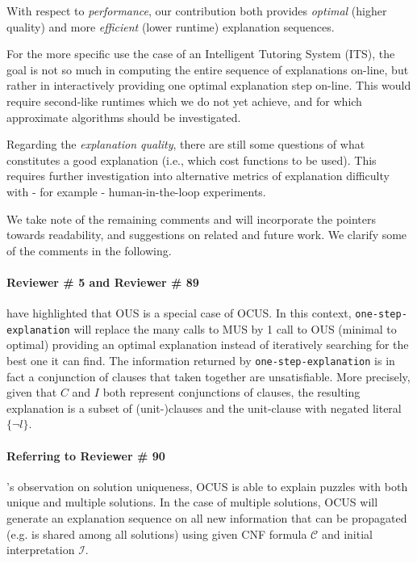 \documentclass{article}
\begin{document}
With respect to \textit{performance}, our contribution both provides \textit{optimal} (higher quality) and more \textit{efficient} (lower runtime) explanation sequences.

For the more specific use the case of an Intelligent Tutoring System (ITS), the goal is not so much in computing the entire sequence of explanations on-line, but rather in interactively providing one optimal explanation step on-line. %
This would require second-like runtimes which we do not yet achieve, and for which approximate algorithms should be investigated.

Regarding the \textit{explanation quality}, there are still some questions of what constitutes a good explanation (i.e., which cost functions to be used). This requires further investigation into alternative metrics of explanation difficulty with - for example - human-in-the-loop experiments.%

\vspace{2em}
\noindent We take note of the remaining comments and will incorporate the pointers towards readability, and suggestions on related and future work. We clarify some of the comments in the following. 


\paragraph{Reviewer \# 5 and Reviewer \# 89} have highlighted that OUS is a special case of OCUS. In this context, \texttt{one-step-explanation} will replace the many calls to MUS by 1 call to OUS (minimal to optimal) providing an optimal explanation instead of iteratively searching for the best one it can find. 
The information returned by \texttt{one-step-explanation} is in fact a conjunction of clauses that taken together are unsatisfiable. More precisely, given that $C$ and $I$ both represent conjunctions of clauses, the resulting explanation is a subset of (unit-)clauses and the unit-clause with negated literal $\{\lnot l \}$.

\paragraph{Referring to Reviewer \# 90}'s observation on solution uniqueness, OCUS is able to explain puzzles with both unique and multiple solutions. In the case of multiple solutions, OCUS will generate an explanation sequence on all new information that can be propagated (e.g. is shared among all solutions) using given CNF formula $\mathcal{C}$ and initial interpretation $\mathcal{I}$.
\end{document}
